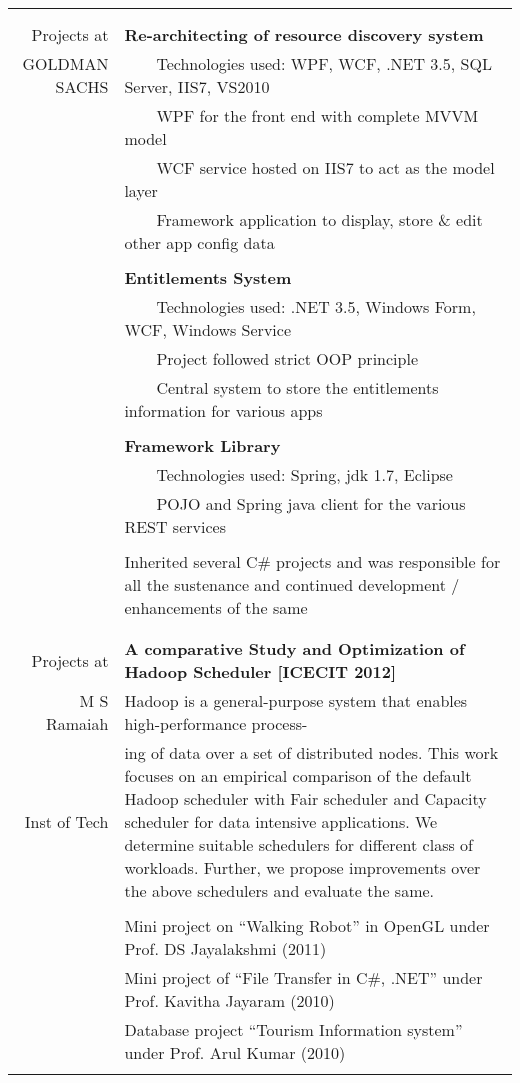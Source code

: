 \documentclass[a4paper,10pt]{article} %
\newcommand{\tabitem}{~~\llap{\textbullet}~~}
\begin{document}
\begin{tabular}{rp{13cm}}
&\\
&\\
Projects at  &  \textbf{Re-architecting of resource discovery system} \\
GOLDMAN SACHS &  \tabitem Technologies used: WPF, WCF, .NET 3.5, SQL Server, IIS7, VS2010 \\
& \tabitem WPF for the front end with complete MVVM model\\
& \tabitem WCF service hosted on IIS7 to act as the model layer\\
& \tabitem Framework application to display, store \& edit other app config data \\
&\\
& \textbf{Entitlements System}\\
& \tabitem Technologies used: .NET 3.5, Windows Form, WCF, Windows Service\\
& \tabitem Project followed strict OOP principle\\
& \tabitem Central system to store the entitlements information for various apps\\
&\\
& \textbf{Framework Library} \\
& \tabitem Technologies used: Spring, jdk 1.7, Eclipse\\
& \tabitem POJO and Spring java client for the various REST services \\ 
& \\
& Inherited several C\# projects and was responsible for all the sustenance and continued development / enhancements of the same\\
&\\
&\\
Projects at & \textbf{A comparative Study and Optimization of Hadoop Scheduler [ICECIT 2012]}\\ 
M S Ramaiah & \setlength{\leftskip}{0.4cm} Hadoop is a general-purpose system that enables high-performance process-\\
Inst of Tech & \setlength{\leftskip}{0.4cm}
ing  of data over a set of distributed nodes. This work focuses on an empirical comparison of the default Hadoop scheduler with Fair scheduler and Capacity scheduler for data intensive applications. We determine suitable schedulers for different class of workloads. Further, we propose improvements over the above schedulers and evaluate  the same.\\ 
& \\
& Mini project on “Walking Robot” in OpenGL under Prof. DS Jayalakshmi (2011)\\ 
& Mini project of “File Transfer in C\#, .NET” under Prof. Kavitha Jayaram (2010)\\
& Database project “Tourism Information system” under Prof. Arul Kumar (2010)\\
& \\
\end{tabular}
\\
\end{document}
